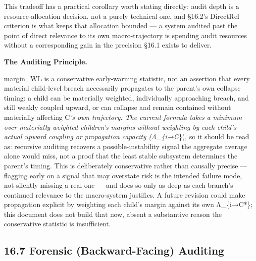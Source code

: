 \documentclass[
]{article}
\begin{document}
This tradeoff has a practical corollary worth stating directly: audit
depth is a resource-allocation decision, not a purely technical one, and
§16.2's DirectRel criterion is what keeps that allocation bounded --- a
system audited past the point of direct relevance to its own
macro-trajectory is spending audit resources without a corresponding
gain in the precision §16.1 exists to deliver.

\textbf{The Auditing Principle.}

margin\_WL is a conservative early-warning statistic, not an assertion
that every material child-level breach necessarily propagates to the
parent's own collapse timing: a child can be materially weighted,
individually approaching breach, and still weakly coupled upward, or can
collapse and remain contained without materially affecting C\emph{'s own
trajectory. The current formula takes a minimum over materially-weighted
children's margins without weighting by each child's actual upward
coupling or propagation capacity (Λ\_\{i→C}\}), so it should be read as:
recursive auditing recovers a possible-instability signal the aggregate
average alone would miss, not a proof that the least stable subsystem
determines the parent's timing. This is deliberately conservative rather
than causally precise --- flagging early on a signal that may overstate
risk is the intended failure mode, not silently missing a real one ---
and does so only as deep as each branch's continued relevance to the
macro-system justifies. A future revision could make propagation
explicit by weighting each child's margin against its own Λ\_\{i→C*\};
this document does not build that now, absent a substantive reason the
conservative statistic is insufficient.

\hypertarget{forensic-backward-facing-auditing}{%
\subsection{16.7 Forensic (Backward-Facing)
Auditing}\label{forensic-backward-facing-auditing}}
\end{document}
